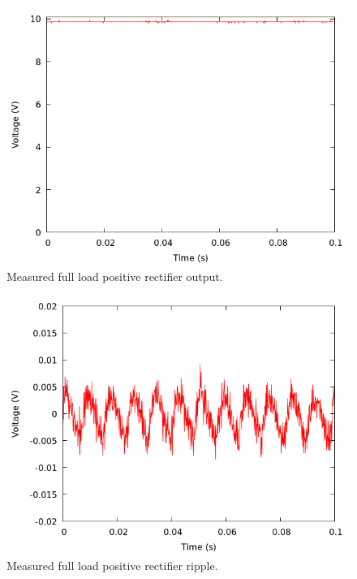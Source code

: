 \documentclass[12pt]{article}
\newcommand{\graphwidth}{0.5\linewidth}
\begin{document}
\begin{appendix}
\begin{figure}[H]
    \centering
    \includegraphics[width=\graphwidth]{./res/image/pos-fullload.png}
    \caption{Measured full load positive rectifier output.}
    \label{fig:pos_fullload}
\end{figure}

\begin{figure}[H]
    \centering
    \includegraphics[width=\graphwidth]{./res/image/pos-fullload-ripple.png}
    \caption{Measured full load positive rectifier ripple.}
    \label{fig:pos_fullload_ripple}
\end{figure}


\end{appendix}
\end{document}
